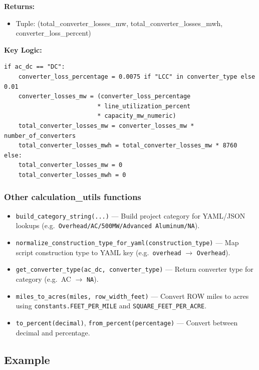 \documentclass[ctcc_full_documentation.tex]{subfiles}
\begin{document}
\textbf{Returns:}
\begin{itemize}
    \item Tuple: (total\_converter\_losses\_mw, total\_converter\_losses\_mwh, converter\_loss\_percent)
\end{itemize}

\textbf{Key Logic:}
\begin{lstlisting}
if ac_dc == "DC":
    converter_loss_percentage = 0.0075 if "LCC" in converter_type else 0.01
    converter_losses_mw = (converter_loss_percentage 
                          * line_utilization_percent 
                          * capacity_mw_numeric)
    total_converter_losses_mw = converter_losses_mw * number_of_converters
    total_converter_losses_mwh = total_converter_losses_mw * 8760
else:
    total_converter_losses_mw = 0
    total_converter_losses_mwh = 0
\end{lstlisting}

\subsubsection{Other calculation\_utils functions}

\begin{itemize}
    \item \texttt{build\_category\_string(...)} --- Build project category for YAML/JSON lookups (e.g.\ \texttt{Overhead/AC/500MW/Advanced Aluminum/NA}).
    \item \texttt{normalize\_construction\_type\_for\_yaml(construction\_type)} --- Map script construction type to YAML key (e.g.\ \texttt{overhead} $\to$ \texttt{Overhead}).
    \item \texttt{get\_converter\_type(ac\_dc, converter\_type)} --- Return converter type for category (e.g.\ AC $\to$ \texttt{NA}).
    \item \texttt{miles\_to\_acres(miles, row\_width\_feet)} --- Convert ROW miles to acres using \texttt{constants.FEET\_PER\_MILE} and \texttt{SQUARE\_FEET\_PER\_ACRE}.
    \item \texttt{to\_percent(decimal)}, \texttt{from\_percent(percentage)} --- Convert between decimal and percentage.
\end{itemize}

\subsection{Example}
\end{document}
